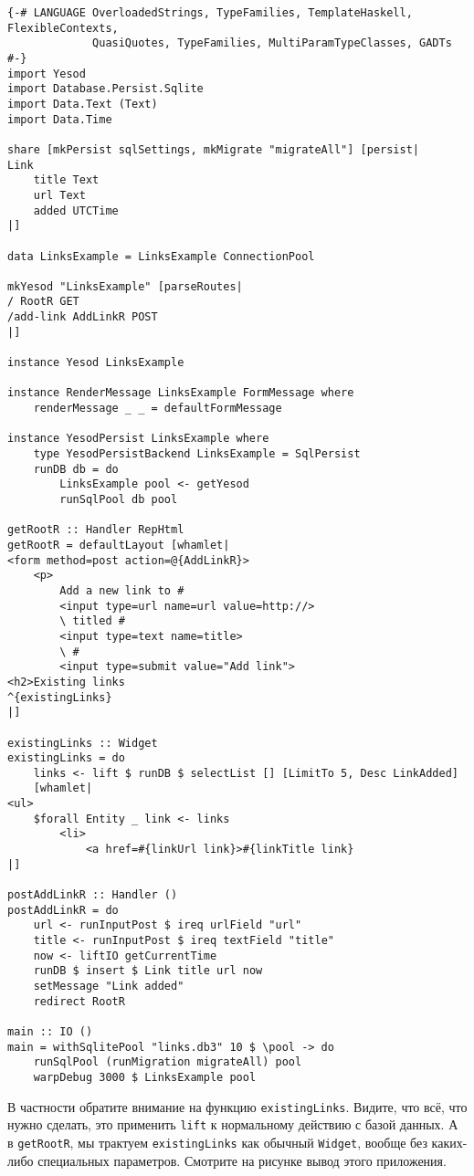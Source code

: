 \begin{lstlisting}
{-# LANGUAGE OverloadedStrings, TypeFamilies, TemplateHaskell, FlexibleContexts,
             QuasiQuotes, TypeFamilies, MultiParamTypeClasses, GADTs #-}
import Yesod
import Database.Persist.Sqlite
import Data.Text (Text)
import Data.Time

share [mkPersist sqlSettings, mkMigrate "migrateAll"] [persist|
Link
    title Text
    url Text
    added UTCTime
|]

data LinksExample = LinksExample ConnectionPool

mkYesod "LinksExample" [parseRoutes|
/ RootR GET
/add-link AddLinkR POST
|]

instance Yesod LinksExample

instance RenderMessage LinksExample FormMessage where
    renderMessage _ _ = defaultFormMessage

instance YesodPersist LinksExample where
    type YesodPersistBackend LinksExample = SqlPersist
    runDB db = do
        LinksExample pool <- getYesod
        runSqlPool db pool

getRootR :: Handler RepHtml
getRootR = defaultLayout [whamlet|
<form method=post action=@{AddLinkR}>
    <p>
        Add a new link to #
        <input type=url name=url value=http://>
        \ titled #
        <input type=text name=title>
        \ #
        <input type=submit value="Add link">
<h2>Existing links
^{existingLinks}
|]

existingLinks :: Widget
existingLinks = do
    links <- lift $ runDB $ selectList [] [LimitTo 5, Desc LinkAdded]
    [whamlet|
<ul>
    $forall Entity _ link <- links
        <li>
            <a href=#{linkUrl link}>#{linkTitle link}
|]

postAddLinkR :: Handler ()
postAddLinkR = do
    url <- runInputPost $ ireq urlField "url"
    title <- runInputPost $ ireq textField "title"
    now <- liftIO getCurrentTime
    runDB $ insert $ Link title url now
    setMessage "Link added"
    redirect RootR

main :: IO ()
main = withSqlitePool "links.db3" 10 $ \pool -> do
    runSqlPool (runMigration migrateAll) pool
    warpDebug 3000 $ LinksExample pool
\end{lstlisting}

В частности обратите внимание на функцию \lstinline'existingLinks'. Видите, что всё, что
нужно сделать, это применить \lstinline'lift' к нормальному действию с базой данных. А в
\lstinline'getRootR', мы трактуем \lstinline'existingLinks' как обычный
\lstinline'Widget', вообще без каких-либо специальных параметров. Смотрите на рисунке
вывод этого приложения.

